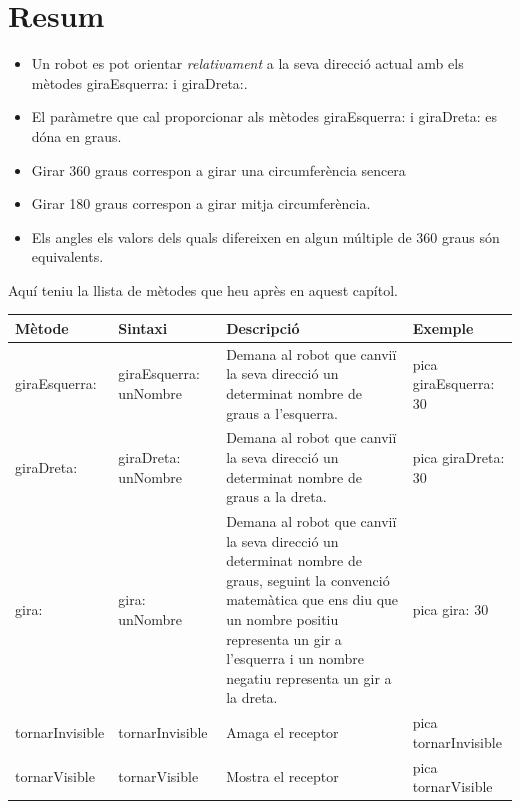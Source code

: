 \section{Resum}

\begin{itemize}
\item Un robot es pot orientar \emph{relativament} a la seva direcció actual amb els mètodes \textsf{giraEsquerra:} i \textsf{giraDreta:}.
\item El paràmetre que cal proporcionar als mètodes \textsf{giraEsquerra:} i \textsf{giraDreta:} es dóna en graus.
\item Girar 360 graus correspon a girar una circumferència sencera
\item Girar 180 graus correspon a girar mitja circumferència.
\item Els angles els valors dels quals difereixen en algun múltiple de 360 graus són equivalents.
\end{itemize}

\newpage

\noindent
Aquí teniu la llista de mètodes que heu après en aquest capítol.   

\vspace*{5mm}
\noindent
\setlength{\extrarowheight}{1mm}
{\small \begin{tabular}{p{18mm}p{38mm}p{45mm}p{30mm}}
\hline
\textbf{Mètode} & \textbf{Sintaxi} & \textbf{Descripció} & \textbf{Exemple}\\
\hline
\textsf{giraEsquerra:} & \textsf{giraEsquerra: unNombre} &
Demana al robot que canviï la seva direcció un determinat nombre de graus a l'esquerra.
& \textsf{pica giraEsquerra: 30} \\
\textsf{giraDreta:} & \textsf{giraDreta: unNombre} &
Demana al robot que canviï la seva direcció un determinat nombre de graus a la dreta.
& \textsf{pica giraDreta: 30} \\
\textsf{gira:} & \textsf{gira: unNombre} &
Demana al robot que canviï la seva direcció un determinat nombre de graus, seguint la convenció matemàtica que ens diu que un nombre positiu representa un gir a l'esquerra i un nombre negatiu representa un gir a la dreta.
& \textsf{pica gira: 30} \\
\textsf{tornarInvisible} & \textsf{tornarInvisible} &
Amaga el receptor
& \textsf{pica tornarInvisible} \\
\textsf{tornarVisible} & \textsf{tornarVisible} &
Mostra el receptor
& \textsf{pica tornarVisible} \\
\hline
\end{tabular}}

